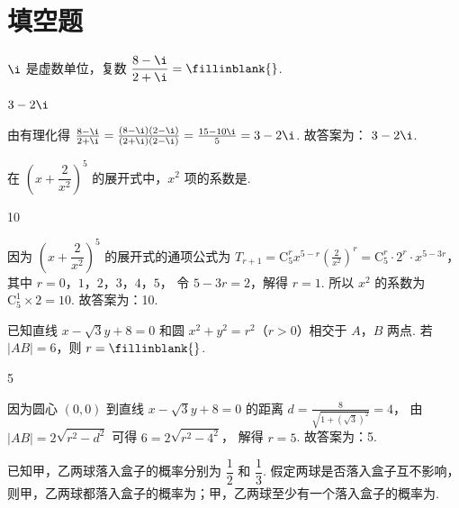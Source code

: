 \section{填空题}

\begin{problem}
\(\i\) 是虚数单位，复数 \(\dfrac{8-\i}{2+\i}=\fillinblank{}\).
\end{problem}

\begin{answer}
\(3-2\i\)
\end{answer}

\begin{solution}
由有理化得
\(\frac{8-\i}{2+\i}=\frac{\left( 8-\i \right)\left( 2-\i \right)}{\left( 2+\i \right)\left( 2-\i \right)}=\frac{15-10\i}{5}=3-2\i\).
故答案为： \( 3-2\i \).
\end{solution}

\begin{problem}
在 \(\left( x+\dfrac{2}{x^2} \right)^5\) 的展开式中，\(x^2\) 项的系数是\fillinblank{}.
\end{problem}

\begin{answer}
10
\end{answer}

\begin{solution}
因为 \( \left( x+\dfrac{2}{x^2} \right)^5 \) 的展开式的通项公式为
\(T_{r+1}=\mathrm{C}_5^r x^{5-r}\left( \frac{2}{x^2} \right)^r=\mathrm{C}_5^r\cdot2^r\cdot x^{5-3r}\)，其中
\(r=0\)，\(1\)，\(2\)，\(3\)，\(4\)，\(5\)，
令 \( 5-3r=2 \)，解得 \( r=1 \).
所以 \( x^2 \) 的系数为 \( \mathrm{C}_5^1\times2=10 \).
故答案为：10.
\end{solution}

\begin{problem}
已知直线 \(x-\sqrt3 y+8=0\) 和圆 \(x^2+y^2=r^2\)（\(r>0\)）相交于 \(A\)，\(B\) 两点. 若 \(|AB|=6\)，则 \(r=\fillinblank{}\).
\end{problem}

\begin{answer}
5
\end{answer}

\begin{solution}
因为圆心 \( (0,0) \) 到直线 \( x-\sqrt3 y+8=0 \) 的距离
\(d=\frac{8}{\sqrt{1+\left( \sqrt3 \right)^2}}=4\)，
由 \( |AB|=2\sqrt{r^2-d^2} \) 可得
\(6=2\sqrt{r^2-4^2}\)，
解得 \( r=5 \).
故答案为：5.
\end{solution}

\begin{problem}
已知甲，乙两球落入盒子的概率分别为 \(\dfrac12\) 和 \(\dfrac13\). 假定两球是否落入盒子互不影响，则甲，乙两球都落入盒子的概率为\fillinblank{}；甲，乙两球至少有一个落入盒子的概率为\fillinblank{}.
\end{problem}


